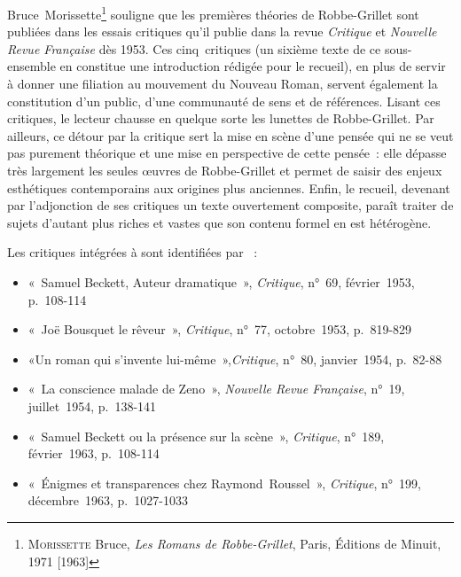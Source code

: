 Bruce~Morissette\footnote{\textsc{Morissette} Bruce, \textit{Les Romans de Robbe-Grillet}, Paris, Éditions de Minuit, 1971 [1963]} souligne que les premières théories de Robbe-Grillet sont publiées dans les essais critiques qu'il publie dans la revue \textit{Critique} et \textit{Nouvelle Revue Française} dès 1953. Ces cinq~critiques (un sixième texte de ce sous-ensemble en constitue une introduction rédigée pour le recueil), en plus de servir à donner une filiation au mouvement du Nouveau Roman, servent également la constitution d'un public, d'une communauté de sens et de références. Lisant ces critiques, le lecteur chausse en quelque sorte les lunettes de Robbe-Grillet. Par ailleurs, ce détour par la critique sert la mise en scène d'une pensée qui ne se veut pas purement théorique et une mise en perspective de cette pensée~: elle dépasse très largement les seules œuvres de Robbe-Grillet et permet de saisir des enjeux esthétiques contemporains aux origines plus anciennes. Enfin, le recueil, devenant par l'adjonction de ses critiques un texte ouvertement composite, paraît traiter de sujets d'autant plus riches et vastes que son contenu formel en est hétérogène.

Les critiques intégrées à \punr{} sont identifiées par \galia~:
\begin{itemize}
    \item «~Samuel Beckett, Auteur dramatique~», \textit{Critique}, n°~69, février~1953, p.~108-114
    \item «~Joë Bousquet le rêveur~», \textit{Critique}, n°~77, octobre~1953, p.~819-829
    \item «Un roman qui s'invente lui-même~»,\textit{Critique}, n°~80, janvier~1954, p.~82-88
    \item «~La conscience malade de Zeno~», \textit{Nouvelle Revue Française}, n°~19, juillet~1954, p.~138-141
    \item «~Samuel Beckett ou la présence sur la scène~», \textit{Critique}, n°~189, février~1963, p.~108-114
    \item «~Énigmes et transparences chez Raymond~Roussel~», \textit{Critique}, n°~199, décembre~1963, p.~1027-1033
\end{itemize}



